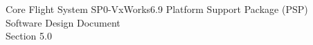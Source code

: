 \documentclass[twoside]{article}
\begin{document}
\hypersetup{pageanchor=false}
\begin{titlepage}
\begin{center}%
\vspace*{7.5cm}
{\Huge Core Flight System SP0-VxWorks6.9 Platform Support Package (PSP)}\\
\vspace*{0.5cm}
{\Huge Software Design Document}\\
\vspace*{0.5cm}
{\Huge Section 5.0}\\
\end{center}
\end{titlepage}
\tableofcontents
{}
\hypersetup{pageanchor=true}

\end{document}
